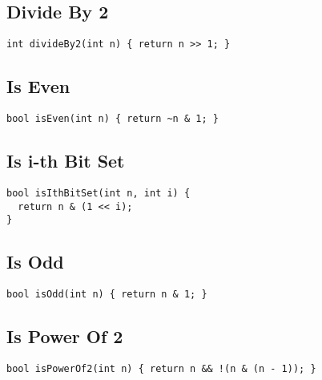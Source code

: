 \documentclass[twoside]{article}
\begin{document}
\begin{multicols*}{2}
\subsectionfont{\large\bfseries\sffamily\underline}
\subsection*{Divide By 2}
\begin{verbatim}
int divideBy2(int n) { return n >> 1; }
\end{verbatim}

\subsectionfont{\large\bfseries\sffamily\underline}
\subsection*{Is Even}
\begin{verbatim}
bool isEven(int n) { return ~n & 1; }
\end{verbatim}

\subsectionfont{\large\bfseries\sffamily\underline}
\subsection*{Is i-th Bit Set}
\begin{verbatim}
bool isIthBitSet(int n, int i) {
  return n & (1 << i);
}
\end{verbatim}

\subsectionfont{\large\bfseries\sffamily\underline}
\subsection*{Is Odd}
\begin{verbatim}
bool isOdd(int n) { return n & 1; }
\end{verbatim}

\subsectionfont{\large\bfseries\sffamily\underline}
\subsection*{Is Power Of 2}
\begin{verbatim}
bool isPowerOf2(int n) { return n && !(n & (n - 1)); }
\end{verbatim}

\subsectionfont{\large\bfseries\sffamily\underline}

\end{multicols*}
\end{document}
